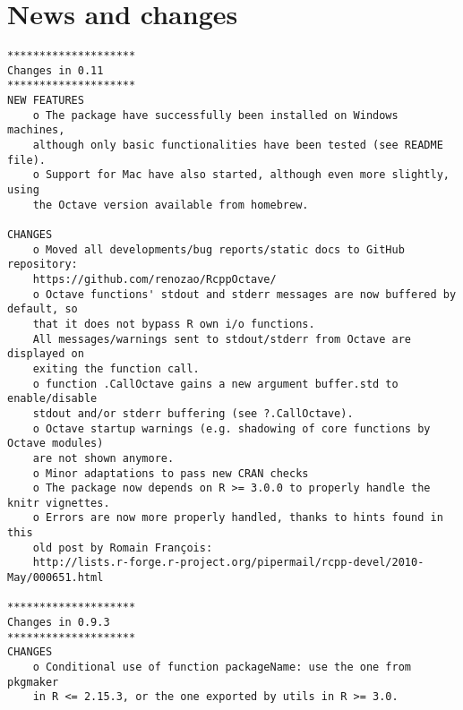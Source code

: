 \documentclass[english,10pt,a4paper]{article}\usepackage[]{graphicx}\usepackage[]{color}
\begin{document}
\section{News and changes}

{\scriptsize
\begin{verbatim}
********************
Changes in 0.11
********************
NEW FEATURES
    o The package have successfully been installed on Windows machines, 
    although only basic functionalities have been tested (see README file).
    o Support for Mac have also started, although even more slightly, using
    the Octave version available from homebrew.

CHANGES
    o Moved all developments/bug reports/static docs to GitHub repository:
    https://github.com/renozao/RcppOctave/ 
    o Octave functions' stdout and stderr messages are now buffered by default, so 
    that it does not bypass R own i/o functions.
    All messages/warnings sent to stdout/stderr from Octave are displayed on 
    exiting the function call.
    o function .CallOctave gains a new argument buffer.std to enable/disable 
    stdout and/or stderr buffering (see ?.CallOctave).
    o Octave startup warnings (e.g. shadowing of core functions by Octave modules) 
    are not shown anymore.
    o Minor adaptations to pass new CRAN checks
    o The package now depends on R >= 3.0.0 to properly handle the knitr vignettes.
    o Errors are now more properly handled, thanks to hints found in this 
    old post by Romain François:
    http://lists.r-forge.r-project.org/pipermail/rcpp-devel/2010-May/000651.html

********************
Changes in 0.9.3
********************
CHANGES
    o Conditional use of function packageName: use the one from pkgmaker 
    in R <= 2.15.3, or the one exported by utils in R >= 3.0. 

\end{verbatim}
}
\end{document}
